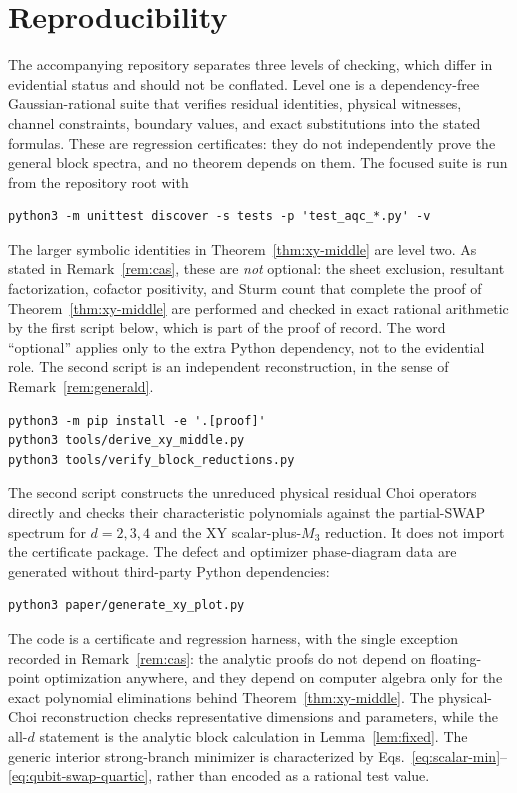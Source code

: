 \documentclass[11pt,a4paper]{article}
\theoremstyle{remark}
\begin{document}
\section{Reproducibility}

The accompanying repository separates three levels of checking, which differ
in evidential status and should not be conflated.  Level one is a
dependency-free Gaussian-rational suite that verifies residual identities,
physical witnesses, channel constraints, boundary values, and exact
substitutions into the stated formulas.  These are regression certificates:
they do not independently prove the general block spectra, and no theorem
depends on them.
The focused suite is
run from the repository root with
\begin{verbatim}
python3 -m unittest discover -s tests -p 'test_aqc_*.py' -v
\end{verbatim}
The larger symbolic identities in Theorem~\ref{thm:xy-middle} are level two.
As stated in Remark~\ref{rem:cas}, these are \emph{not} optional: the sheet
exclusion, resultant factorization, cofactor positivity, and Sturm count that
complete the proof of Theorem~\ref{thm:xy-middle} are performed and checked in
exact rational arithmetic by the first script below, which is part of the
proof of record.  The word ``optional'' applies only to the extra Python
dependency, not to the evidential role.  The second script is an independent
reconstruction, in the sense of Remark~\ref{rem:generald}.
\begin{verbatim}
python3 -m pip install -e '.[proof]'
python3 tools/derive_xy_middle.py
python3 tools/verify_block_reductions.py
\end{verbatim}
The second script constructs the unreduced physical residual Choi operators
directly and checks their characteristic polynomials against the
partial-SWAP spectrum for $d=2,3,4$ and the XY scalar-plus-$M_3$ reduction.
It does not import the certificate package.
The defect and optimizer phase-diagram data are generated without third-party
Python dependencies:
\begin{verbatim}
python3 paper/generate_xy_plot.py
\end{verbatim}
The code is a certificate and regression harness, with the single exception
recorded in Remark~\ref{rem:cas}: the analytic proofs do not depend on
floating-point optimization anywhere, and they depend on computer algebra only
for the exact polynomial eliminations behind Theorem~\ref{thm:xy-middle}.
The physical-Choi reconstruction
checks representative dimensions and parameters, while the all-$d$ statement
is the analytic block calculation in Lemma~\ref{lem:fixed}.  The generic
interior strong-branch minimizer is characterized by
Eqs.~\eqref{eq:scalar-min}--\eqref{eq:qubit-swap-quartic}, rather than encoded
as a rational test value.
\end{document}
